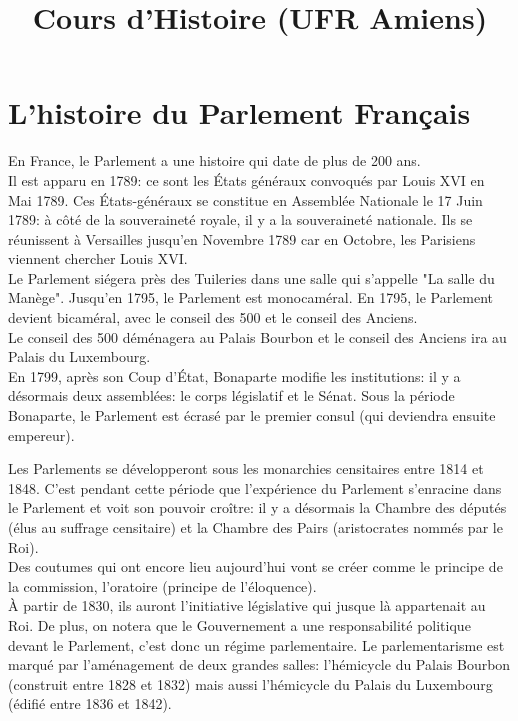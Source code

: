 \documentclass[12pt, a4paper, openany]{book}
\date{}
\title{Cours d'Histoire (UFR Amiens)}
\begin{document}
\maketitle

\section{L'histoire du Parlement Français}

En France, le Parlement a une histoire qui date de plus de 200 ans. \\
Il est apparu en 1789: ce sont les États généraux convoqués par Louis XVI en Mai 1789. Ces États-généraux se constitue en Assemblée Nationale le 17 Juin 1789: à côté de la souveraineté royale, il y a la souveraineté nationale. Ils se réunissent à Versailles jusqu'en Novembre 1789 car en Octobre, les Parisiens viennent chercher Louis XVI. \\
Le Parlement siégera près des Tuileries dans une salle qui s'appelle "La salle du Manège". Jusqu'en 1795, le Parlement est monocaméral. En 1795, le Parlement devient bicaméral, avec le conseil des 500 et le conseil des Anciens. \\
Le conseil des 500 déménagera au Palais Bourbon et le conseil des Anciens ira au Palais du Luxembourg. \\
En 1799, après son Coup d'État, Bonaparte modifie les institutions: il y a désormais deux assemblées: le corps législatif et le Sénat. Sous la période Bonaparte, le Parlement est écrasé par le premier consul (qui deviendra ensuite empereur).


Les Parlements se développeront sous les monarchies censitaires entre 1814 et 1848. C'est pendant cette période que l'expérience du Parlement s'enracine dans le Parlement et voit son pouvoir croître: il y a désormais la Chambre des députés (élus au suffrage censitaire) et la Chambre des Pairs (aristocrates nommés par le Roi). \\ 
Des coutumes qui ont encore lieu aujourd'hui vont se créer comme le principe de la commission, l'oratoire (principe de l'éloquence). \\
À partir de 1830, ils auront l'initiative législative qui jusque là appartenait au Roi. De plus, on notera que le Gouvernement a une responsabilité politique devant le Parlement, c'est donc un régime parlementaire. Le parlementarisme est marqué par l'aménagement de deux grandes salles: l'hémicycle du Palais Bourbon (construit entre 1828 et 1832) mais aussi l'hémicycle du Palais du Luxembourg (édifié entre 1836 et 1842).
\end{document}
